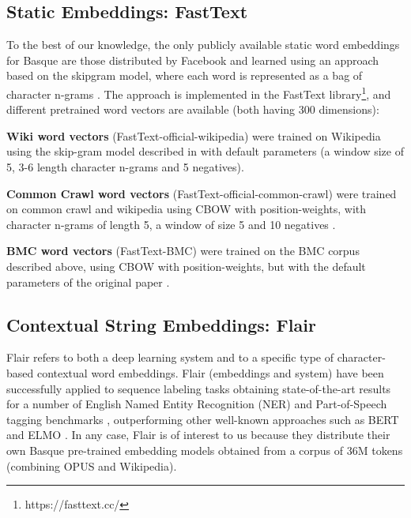 \documentclass[10pt, a4paper]{article}
\begin{document}
\subsection{Static Embeddings: FastText}\label{sec:build-basq-models:static}

To the best of our knowledge, the only publicly available static word embeddings for Basque are those distributed by Facebook and learned using an approach based on the skipgram model, where  each  word  is  represented as a bag of character n-grams \cite{fasttext1_bojanowski2017enriching}. The approach is implemented in the FastText library\footnote{https://fasttext.cc/}, and different pretrained word vectors are available (both having 300 dimensions):

\textbf{Wiki word vectors} (FastText-official-wikipedia) were trained on Wikipedia using the skip-gram model described in \cite{fasttext1_bojanowski2017enriching} with default parameters (a window size of 5, 3-6 length character n-grams and 5 negatives).

\textbf{Common Crawl word vectors} (FastText-official-common-crawl) were trained on common crawl and wikipedia using CBOW with position-weights, with character n-grams of length 5, a window of size 5 and 10 negatives .  \cite{fasttext2_grave2018learning}

\textbf{BMC word vectors} (FastText-BMC) were trained on the BMC corpus described above, using CBOW with position-weights, but with the default parameters of the original paper \cite{fasttext1_bojanowski2017enriching}.

\subsection{Contextual String Embeddings: Flair}\label{sec:build-basq-models:flair}


Flair refers to both a deep learning system and to a specific type of character-based contextual word embeddings. Flair (embeddings and system) have been successfully applied to sequence labeling tasks obtaining state-of-the-art results for a number of English Named Entity Recognition (NER) and Part-of-Speech tagging benchmarks \cite{akbik2018coling}, outperforming other well-known approaches such as BERT and ELMO \cite{devlin2019bert,Peters:2018}. In any case, Flair is of interest to us because they distribute their own Basque pre-trained embedding models obtained from a corpus of 36M tokens (combining OPUS and Wikipedia).
\end{document}
